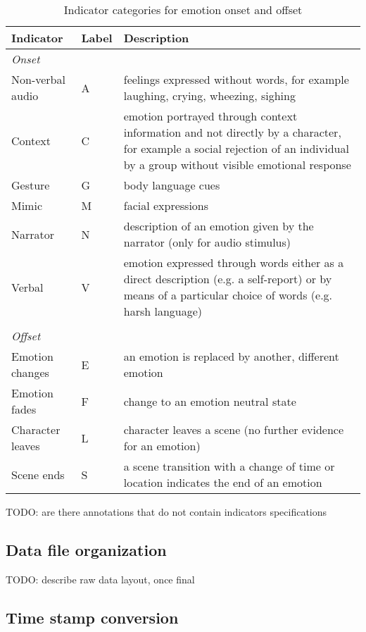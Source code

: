 \begin{table}
  \centering
  \begin{tabular}{llp{8cm}}
    Indicator & Label & Description \\
    \hline
    \textit{Onset}\\
    Non-verbal audio & A & feelings expressed without words, for example laughing, crying, wheezing, sighing\\
    Context & C & emotion portrayed through context information and not directly by a character, for example a social rejection of an individual by a group without visible emotional response\\
    Gesture & G & body language cues \\
    Mimic & M & facial expressions \\
    Narrator & N & description of an emotion given by the narrator (only for audio stimulus)\\
    Verbal & V & emotion expressed through words either as a direct description (e.g. a self-report) or by means of a particular choice of words (e.g. harsh language)\\
    \\
    \textit{Offset}\\
    Emotion changes & E & an emotion is replaced by another, different emotion \\
    Emotion fades & F & change to an emotion neutral state \\
    Character leaves & L & character leaves a scene (no further evidence for an emotion)\\
    Scene ends & S & a scene transition with a change of time or location indicates the end of an emotion\\

  \end{tabular}
  \caption{Indicator categories for emotion onset and offset}
  \label{tab:onoffset_indicators}
\end{table}

TODO: are there annotations that do not contain indicators specifications

\subsection*{Data file organization}

TODO: describe raw data layout, once final

\subsection*{Time stamp conversion}

